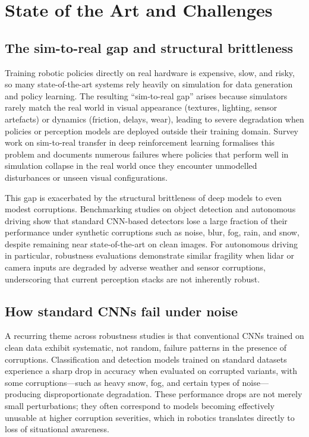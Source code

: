 \documentclass[11pt,a4paper]{article}
\begin{document}
\section{State of the Art and Challenges}

\subsection{The sim-to-real gap and structural brittleness}
Training robotic policies directly on real hardware is expensive, slow, and risky, so many state-of-the-art systems rely heavily on simulation for data generation and policy learning. The resulting ``sim-to-real gap'' arises because simulators rarely match the real world in visual appearance (textures, lighting, sensor artefacts) or dynamics (friction, delays, wear), leading to severe degradation when policies or perception models are deployed outside their training domain. Survey work on sim-to-real transfer in deep reinforcement learning formalises this problem and documents numerous failures where policies that perform well in simulation collapse in the real world once they encounter unmodelled disturbances or unseen visual configurations.

This gap is exacerbated by the structural brittleness of deep models to even modest corruptions. Benchmarking studies on object detection and autonomous driving show that standard CNN-based detectors lose a large fraction of their performance under synthetic corruptions such as noise, blur, fog, rain, and snow, despite remaining near state-of-the-art on clean images. For autonomous driving in particular, robustness evaluations demonstrate similar fragility when lidar or camera inputs are degraded by adverse weather and sensor corruptions, underscoring that current perception stacks are not inherently robust.

\subsection{How standard CNNs fail under noise}
A recurring theme across robustness studies is that conventional CNNs trained on clean data exhibit systematic, not random, failure patterns in the presence of corruptions. Classification and detection models trained on standard datasets experience a sharp drop in accuracy when evaluated on corrupted variants, with some corruptions---such as heavy snow, fog, and certain types of noise---producing disproportionate degradation. These performance drops are not merely small perturbations; they often correspond to models becoming effectively unusable at higher corruption severities, which in robotics translates directly to loss of situational awareness.
\end{document}
